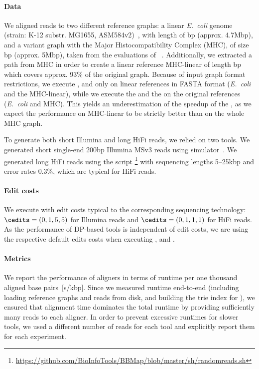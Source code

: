 \paragraph{Data}
%
We aligned reads to two different reference graphs: a linear \textit{E.~coli}
genome (strain: K-12 substr. MG1655, ASM584v2)~\citep{howe2019ensembl}, with
length of bp (approx. 4.7Mbp), and a variant graph with the
Major Histocompatibility Complex (MHC), of size bp (approx.
5Mbp), taken from the evaluations of \pasgal~\citep{jain_accelerating_2019}.
%
Additionally, we extracted a path from MHC in order to create a linear reference
MHC-linear of length bp which covers approx. 93\% of the
original graph. Because of input graph format restrictions, we execute
\graphaligner, \vargas and \pasgal only on linear references in FASTA format
(\textit{E.~coli} and the MHC-linear), while we execute the \sh and the
\prefixh on the original references (\textit{E.~coli} and MHC). This yields an
underestimation of the speedup of the \sh, as we expect the performance on
MHC-linear to be strictly better than on the whole MHC graph.

To generate both short Illumina and long HiFi reads, we relied on two tools. We
generated short single-end 200bp Illumina MSv3 reads using \art
simulator~\citep{huang2011art}. We generated long HiFi reads using the script
\randomreads\footnote{\url{https://github.com/BioInfoTools/BBMap/blob/master/sh/randomreads.sh}}
with sequencing lengths \mbox{5--25kbp} and error rates 0.3\%, which are typical
for HiFi reads.

\paragraph{Edit costs}
We execute \astarix with edit costs typical to the corresponding sequencing
technology: $\cedits=(0,1,5,5)$ for Illumina reads and $\cedits=(0,1,1,1)$ for
HiFi reads. As the performance of DP-based tools is independent of edit costs,
we are using the respective default edits costs when executing \graphaligner,
\pasgal and \vargas.


\paragraph{Metrics}
%
We report the performance of aligners in terms of runtime per one thousand
aligned base pairs~[s/kbp]. Since we measured runtime end-to-end (including
loading reference graphs and reads from disk, and building the trie index for
\astarix), we ensured that alignment time dominates the total runtime by
providing sufficiently many reads to each aligner. In order to prevent excessive
runtimes for slower tools, we used a different number of reads for each tool
and explicitly report them for each experiment.

